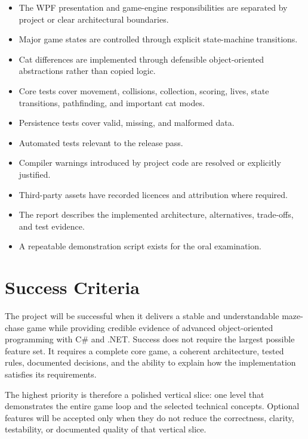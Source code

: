 \begin{itemize}
	\item[$\square$] The WPF presentation and game-engine responsibilities are separated by project or clear architectural boundaries.
	\item[$\square$] Major game states are controlled through explicit state-machine transitions.
	\item[$\square$] Cat differences are implemented through defensible object-oriented abstractions rather than copied logic.
	\item[$\square$] Core tests cover movement, collisions, collection, scoring, lives, state transitions, pathfinding, and important cat modes.
	\item[$\square$] Persistence tests cover valid, missing, and malformed data.
	\item[$\square$] Automated tests relevant to the release pass.
	\item[$\square$] Compiler warnings introduced by project code are resolved or explicitly justified.
	\item[$\square$] Third-party assets have recorded licences and attribution where required.
	\item[$\square$] The report describes the implemented architecture, alternatives, trade-offs, and test evidence.
	\item[$\square$] A repeatable demonstration script exists for the oral examination.
\end{itemize}

\section{Success Criteria}

The project will be successful when it delivers a stable and understandable maze-chase game while providing credible evidence of advanced object-oriented programming with C\# and .NET. Success does not require the largest possible feature set. It requires a complete core game, a coherent architecture, tested rules, documented decisions, and the ability to explain how the implementation satisfies its requirements.

The highest priority is therefore a polished vertical slice: one level that demonstrates the entire game loop and the selected technical concepts. Optional features will be accepted only when they do not reduce the correctness, clarity, testability, or documented quality of that vertical slice.
